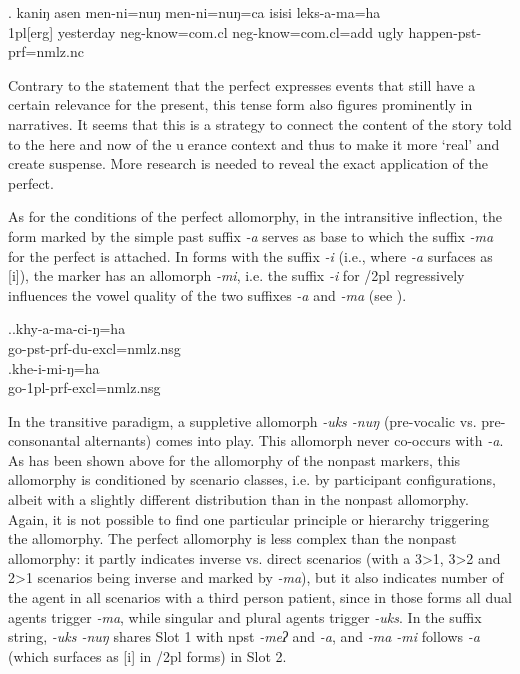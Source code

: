 \exg.	kaniŋ asen      men-ni=nuŋ         men-ni=nuŋ=ca                isisi leks-a-ma=ha\\
{\sc  1pl[erg]} yesterday {\sc neg-}know{\sc =com.cl} {\sc neg-}know{\sc =com.cl=add} ugly happen{\sc [3sg]-pst-prf=nmlz.nc}\\
 
	
Contrary to the statement that the perfect expresses events that still have a certain relevance for the present, this tense form also figures prominently in narratives. It seems that this is a strategy to connect the content of the story told to the here and now of the uerance context and thus to make it more ‘real’ and create suspense. More research is needed to reveal the exact application of the perfect.

As for the conditions of the perfect allomorphy, in the intransitive inflection, the form marked by the simple past suffix \emph{-a} serves as base to which the suffix \emph{-ma} for the perfect is attached. In forms with the suffix \emph{-i}  (i.e., where \emph{-a} surfaces as [i]), the marker has an allomorph \emph{-mi}, i.e. the suffix \emph{-i} for  {/2pl} regressively influences the vowel quality of the two suffixes \emph{-a} and \emph{-ma} (see \Next). 

\ex.\ag.khy-a-ma-ci-ŋ=ha\\
go{\sc -pst-prf-du-excl=nmlz.nsg}\\
\bg.khe-i-mi-ŋ=ha\\
go{\sc -1pl-prf-excl=nmlz.nsg}\\


In the transitive paradigm, a suppletive allomorph \emph{-uks \ti -nuŋ} (pre-vocalic vs. pre-consonantal alternants) comes into play. This allomorph never co-occurs with \emph{-a}. As has been shown above for the allomorphy of the nonpast markers, this allomorphy is conditioned by scenario classes, i.e. by participant configurations, albeit with a slightly different distribution than in the nonpast allomorphy. Again, it is  not possible to find one particular  principle or hierarchy triggering the allomorphy. The perfect allomorphy is less complex than the nonpast allomorphy: it partly indicates inverse vs. direct scenarios (with a 3>1, 3>2 and 2>1 scenarios being inverse and marked by \emph{-ma}), but it also indicates number of the agent in all scenarios with a third person patient, since in those forms all dual agents trigger \emph{-ma}, while singular and plural agents trigger \emph{-uks}. In the suffix string, \emph{-uks \ti -nuŋ} shares Slot 1 with {\sc npst} \emph{-meʔ} and   \emph{-a}, and \emph{-ma \ti -mi} follows  \emph{-a} (which surfaces as [i] in {/2pl} forms)  in Slot 2.

